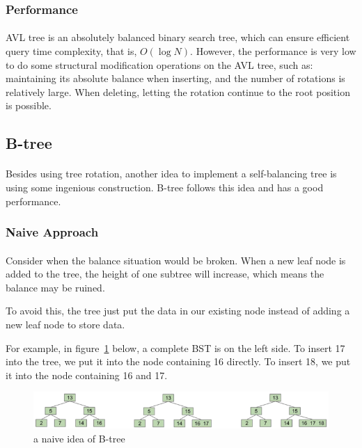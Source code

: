 \documentclass{article}
\begin{document}
\subsubsection{Performance}

\paragraph{}
AVL tree is an absolutely balanced binary search tree, which can ensure efficient query time complexity, that is, $O(\log{N})$. However, the performance is very low to do some structural modification operations on the AVL tree, such as: maintaining its absolute balance when inserting, and the number of rotations is relatively large. When deleting, letting the rotation continue to the root position is possible.


\newpage


\subsection{B-tree}

\paragraph{}
Besides using tree rotation, another idea to implement a self-balancing tree is using some ingenious construction. B-tree follows this idea and has a good performance.

\subsubsection{Naive Approach}

\paragraph{}
Consider when the balance situation would be broken. When a new leaf node is added to the tree, the height of one subtree will increase, which means the balance may be ruined.

To avoid this, the tree just put the data in our existing node instead of adding a new leaf node to store data.

For example, in figure~\ref{naive_b_example} below, a complete BST is on the left side. To insert 17 into the tree, we put it into the node containing 16 directly. To insert 18, we put it into the node containing 16 and 17.

\begin{figure}[htbp]
    \centering
	\includegraphics[width = \textwidth]{naive_b_example.png}
	\caption{a naive idea of B-tree}
	\label{naive_b_example}
\end{figure}
\end{document}
